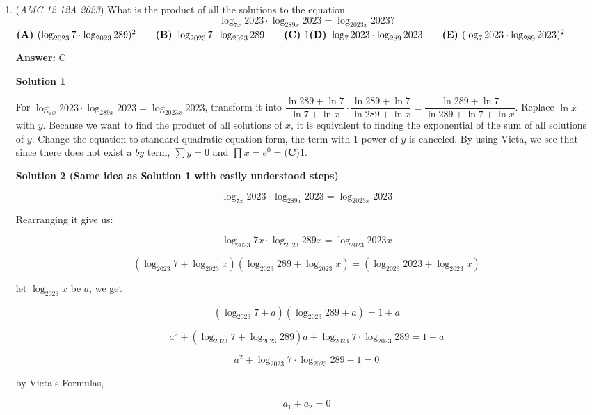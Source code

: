 \begin{enumerate}
 Note: This solution doesn't work because $\dfrac{1}{9}$ is actually closer than $\dfrac{3}{28}$ to $\dfrac{1}{8}$. 

 


	\item (\textit{AMC 12 12A 2023}) What is the product of all the solutions to the equation 
 \[\log_{7x}2023 \cdot \log_{289x} 2023 = \log_{2023x} 2023?\]
$\textbf{(A) }(\log_{2023}7 \cdot \log_{2023}289)^2 \qquad\textbf{(B) }\log_{2023}7 \cdot \log_{2023}289\qquad\textbf{(C) } 1 \\ \\ \textbf{(D) }\log_{7}2023 \cdot \log_{289}2023\qquad\textbf{(E) }(\log_{7}2023 \cdot \log_{289}2023)^2$

 \textbf{Answer: }C



\textbf{Solution 1}

For $\log_{7x}2023\cdot \log_{289x}2023=\log_{2023x}2023$, transform it into $\dfrac{\ln 289+\ln 7}{\ln 7 + \ln x}\cdot \dfrac{\ln 289+\ln 7}{\ln 289 + \ln x}=\dfrac{\ln 289+\ln 7}{\ln 289+\ln 7+\ln x}$. Replace $\ln x$ with $y$. Because we want to find the product of all solutions of $x$, it is equivalent to finding the exponential of the sum of all solutions of $y$. Change the equation to standard quadratic equation form, the term with 1 power of $y$ is canceled.  By using Vieta, we see that since there does not exist a $by$ term, $\sum y=0$ and $\prod x=e^0=\boxed{\textbf{(C)} 1}$.

 



\textbf{Solution 2 (Same idea as Solution 1 with easily understood steps)}


 \[\log_{7x}2023\cdot \log_{289x}2023=\log_{2023x}2023\]

 Rearranging it give us:

 
 \[\log_{2023}7x\cdot \log_{2023}289x=\log_{2023}2023x\]

 \[(\log_{2023}7+\log_{2023}x)(\log_{2023}289+\log_{2023}x)=(\log_{2023}2023+\log_{2023}x)\]

 let $\log_{2023}x$ be $a$, we get

 
 \[(\log_{2023}7+a)(\log_{2023}289+a)=1+a\]

 \[a^2+(\log_{2023}7+\log_{2023}289)a+\log_{2023}7 \cdot \log_{2023}289=1+a\]

 \[a^2+\log_{2023}7 \cdot \log_{2023}289-1=0\]

 by Vieta's Formulas,

 
 \[a_1+a_2=0\]


\end{enumerate}
